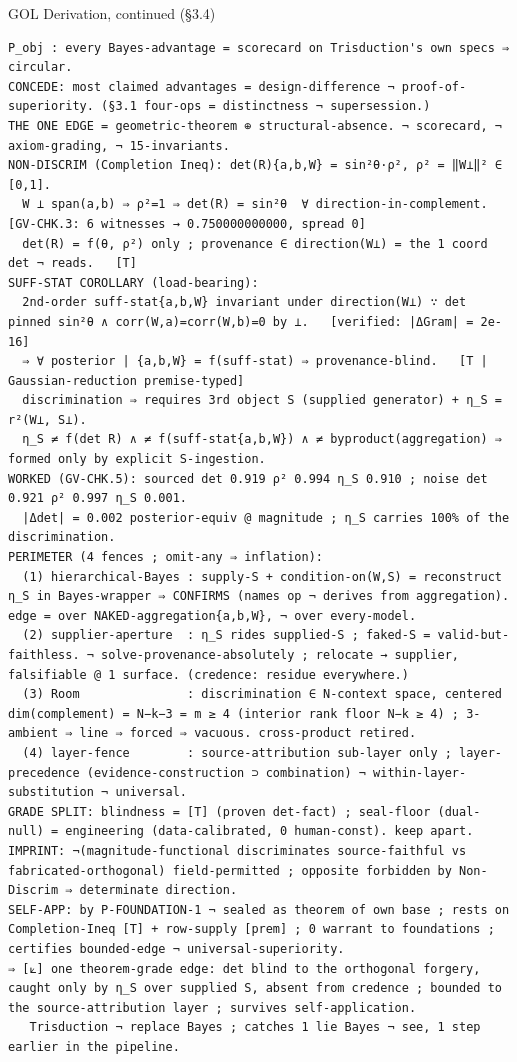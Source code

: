 \documentclass[10pt,twocolumn]{article}
\begin{document}
\begin{golbox}{GOL Derivation, continued (§3.4)}
\begin{lstlisting}[style=golv]
P_obj : every Bayes-advantage = scorecard on Trisduction's own specs ⇒ circular.
CONCEDE: most claimed advantages = design-difference ¬ proof-of-superiority. (§3.1 four-ops = distinctness ¬ supersession.)
THE ONE EDGE = geometric-theorem ⊕ structural-absence. ¬ scorecard, ¬ axiom-grading, ¬ 15-invariants.
NON-DISCRIM (Completion Ineq): det(R){a,b,W} = sin²θ·ρ², ρ² = ‖W⟂‖² ∈ [0,1].
  W ⊥ span(a,b) ⇒ ρ²=1 ⇒ det(R) = sin²θ  ∀ direction-in-complement.   [GV-CHK.3: 6 witnesses → 0.750000000000, spread 0]
  det(R) = f(θ, ρ²) only ; provenance ∈ direction(W⟂) = the 1 coord det ¬ reads.   [T]
SUFF-STAT COROLLARY (load-bearing):
  2nd-order suff-stat{a,b,W} invariant under direction(W⟂) ∵ det pinned sin²θ ∧ corr(W,a)=corr(W,b)=0 by ⊥.   [verified: |ΔGram| = 2e-16]
  ⇒ ∀ posterior | {a,b,W} = f(suff-stat) ⇒ provenance-blind.   [T | Gaussian-reduction premise-typed]
  discrimination ⇒ requires 3rd object S (supplied generator) + η_S = r²(W⟂, S⟂).
  η_S ≠ f(det R) ∧ ≠ f(suff-stat{a,b,W}) ∧ ≠ byproduct(aggregation) ⇒ formed only by explicit S-ingestion.
WORKED (GV-CHK.5): sourced det 0.919 ρ² 0.994 η_S 0.910 ; noise det 0.921 ρ² 0.997 η_S 0.001.
  |Δdet| = 0.002 posterior-equiv @ magnitude ; η_S carries 100% of the discrimination.
PERIMETER (4 fences ; omit-any ⇒ inflation):
  (1) hierarchical-Bayes : supply-S + condition-on(W,S) = reconstruct η_S in Bayes-wrapper ⇒ CONFIRMS (names op ¬ derives from aggregation). edge = over NAKED-aggregation{a,b,W}, ¬ over every-model.
  (2) supplier-aperture  : η_S rides supplied-S ; faked-S = valid-but-faithless. ¬ solve-provenance-absolutely ; relocate → supplier, falsifiable @ 1 surface. (credence: residue everywhere.)
  (3) Room               : discrimination ∈ N-context space, centered dim(complement) = N−k−3 = m ≥ 4 (interior rank floor N−k ≥ 4) ; 3-ambient ⇒ line ⇒ forced ⇒ vacuous. cross-product retired.
  (4) layer-fence        : source-attribution sub-layer only ; layer-precedence (evidence-construction ⊃ combination) ¬ within-layer-substitution ¬ universal.
GRADE SPLIT: blindness = [T] (proven det-fact) ; seal-floor (dual-null) = engineering (data-calibrated, 0 human-const). keep apart.
IMPRINT: ¬(magnitude-functional discriminates source-faithful vs fabricated-orthogonal) field-permitted ; opposite forbidden by Non-Discrim ⇒ determinate direction.
SELF-APP: by P-FOUNDATION-1 ¬ sealed as theorem of own base ; rests on Completion-Ineq [T] + row-supply [prem] ; 0 warrant to foundations ; certifies bounded-edge ¬ universal-superiority.
⇒ [⟀] one theorem-grade edge: det blind to the orthogonal forgery, caught only by η_S over supplied S, absent from credence ; bounded to the source-attribution layer ; survives self-application.
   Trisduction ¬ replace Bayes ; catches 1 lie Bayes ¬ see, 1 step earlier in the pipeline.
\end{lstlisting}
\end{golbox}
\end{document}
